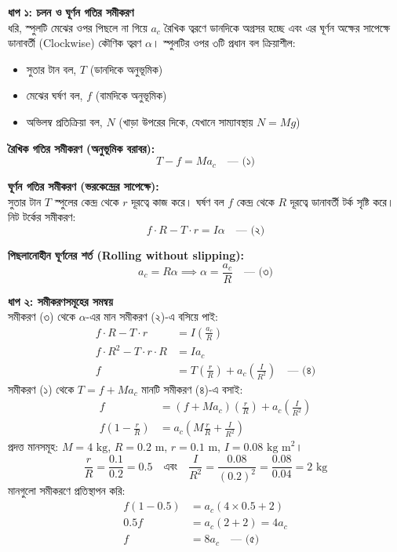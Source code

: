 \documentclass[12pt, a4paper]{article}
\begin{document}
\begin{tcolorbox}[solutionbox={সমাধান (Solution)}]
\noindent
\textbf{ধাপ ১: চলন ও ঘূর্ণন গতির সমীকরণ} \\
ধরি, স্পুলটি মেঝের ওপর পিছলে না গিয়ে $a_c$ রৈখিক ত্বরণে ডানদিকে অগ্রসর হচ্ছে এবং এর ঘূর্ণন অক্ষের সাপেক্ষে ডানাবর্তী (Clockwise) কৌণিক ত্বরণ $\alpha$। স্পুলটির ওপর ৩টি প্রধান বল ক্রিয়াশীল:
\begin{itemize}[leftmargin=*, parsep=0.5ex]
    \item সুতার টান বল, $T$ (ডানদিকে অনুভূমিক)
    \item মেঝের ঘর্ষণ বল, $f$ (বামদিকে অনুভূমিক)
    \item অভিলম্ব প্রতিক্রিয়া বল, $N$ (খাড়া উপরের দিকে, যেখানে সাম্যাবস্থায় $N = Mg$)
\end{itemize}

\textbf{রৈখিক গতির সমীকরণ (অনুভূমিক বরাবর):}
\[ T - f = M a_c \quad \text{--- (১)} \]

\textbf{ঘূর্ণন গতির সমীকরণ (ভরকেন্দ্রের সাপেক্ষে):} \\
সুতার টান $T$ স্পুলের কেন্দ্র থেকে $r$ দূরত্বে কাজ করে। ঘর্ষণ বল $f$ কেন্দ্র থেকে $R$ দূরত্বে ডানাবর্তী টর্ক সৃষ্টি করে। নিট টর্কের সমীকরণ:
\[ f \cdot R - T \cdot r = I \alpha \quad \text{--- (২)} \]

\textbf{পিছলানোহীন ঘূর্ণনের শর্ত (Rolling without slipping):}
\[ a_c = R \alpha \implies \alpha = \frac{a_c}{R} \quad \text{--- (৩)} \]

\vspace{0.5em}
\noindent
\textbf{ধাপ ২: সমীকরণসমূহের সমন্বয়} \\
সমীকরণ (৩) থেকে $\alpha$-এর মান সমীকরণ (২)-এ বসিয়ে পাই:
\begin{align*}
    f \cdot R - T \cdot r &= I \left( \frac{a_c}{R} \right) \\
    f \cdot R^2 - T \cdot r \cdot R &= I a_c \\
    f &= T\left(\frac{r}{R}\right) + a_c\left(\frac{I}{R^2}\right) \quad \text{--- (৪)}
\end{align*}
সমীকরণ (১) থেকে $T = f + M a_c$ মানটি সমীকরণ (৪)-এ বসাই:
\begin{align*}
    f &= (f + M a_c)\left(\frac{r}{R}\right) + a_c\left(\frac{I}{R^2}\right) \\
    f \left( 1 - \frac{r}{R} \right) &= a_c \left( M\frac{r}{R} + \frac{I}{R^2} \right)
\end{align*}
প্রদত্ত মানসমূহ: $M = 4\text{ kg}$, $R = 0.2\text{ m}$, $r = 0.1\text{ m}$, $I = 0.08\text{ kg m}^2$।
\[ \frac{r}{R} = \frac{0.1}{0.2} = 0.5 \quad \text{এবং} \quad \frac{I}{R^2} = \frac{0.08}{(0.2)^2} = \frac{0.08}{0.04} = 2\text{ kg} \]
মানগুলো সমীকরণে প্রতিস্থাপন করি:
\begin{align*}
    f (1 - 0.5) &= a_c (4 \times 0.5 + 2) \\
    0.5 f &= a_c (2 + 2) = 4 a_c \\
    f &= 8 a_c \quad \text{--- (৫)}
\end{align*}


\end{tcolorbox}
\end{document}

